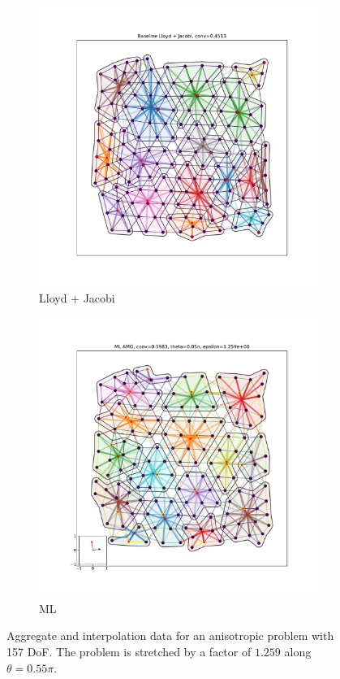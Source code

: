 \documentclass{article}
\begin{document}
\begin{figure}[h]
\begin{subfigure}[t]{0.32\textwidth}
    \includegraphics[width=\textwidth, trim=80 70 70 50, clip]{grid_anis_8_lloyd.pdf}
    \caption{Lloyd + Jacobi}
  \end{subfigure}
  \begin{subfigure}[t]{0.32\textwidth}
    \centering
    \includegraphics[width=\textwidth, trim=80 70 70 50, clip]{grid_anis_8_ml.pdf}
    \caption{ML}
  \end{subfigure}
  \caption{Aggregate and interpolation data for an anisotropic problem with 157 DoF.  The problem is stretched by a factor of $1.259$ along $\theta=0.55\pi$.}
  \label{fig:grid_anis_8}
\end{figure}
\end{document}
